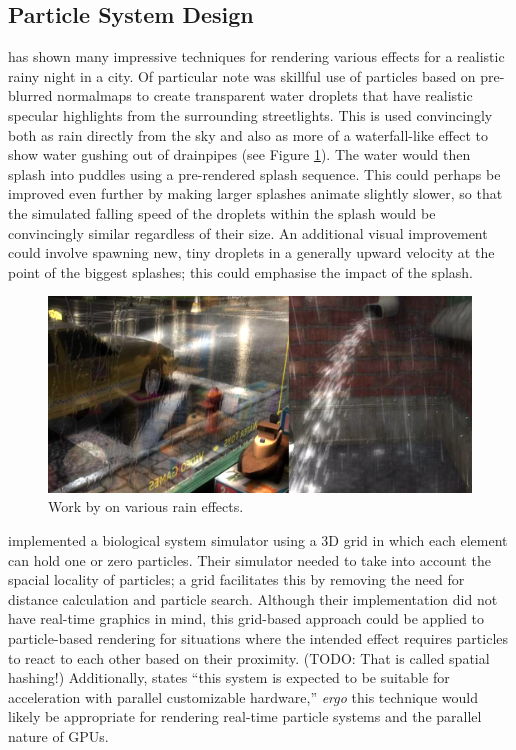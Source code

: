 \documentclass[11pt, a4paper, twocolumn]{article}
\begin{document}
\subsection{Particle System Design}

\citet{Tatarchuk2006} has shown many impressive techniques for rendering various effects for a realistic rainy night in a city. Of particular note was skillful use of particles based on pre-blurred normalmaps to create transparent water droplets that have realistic specular highlights from the surrounding streetlights. This is used convincingly both as rain directly from the sky and also as more of a waterfall-like effect to show water gushing out of drainpipes (see Figure \ref{fig:tatarchuk}). The water would then splash into puddles using a pre-rendered splash sequence. This could perhaps be improved even further by making larger splashes animate slightly slower, so that the simulated falling speed of the droplets within the splash would be convincingly similar regardless of their size. An additional visual improvement could involve spawning new, tiny droplets in a generally upward velocity at the point of the biggest splashes; this could emphasise the impact of the splash.

\begin{figure}[h]
\includegraphics[width=\linewidth]{tatarchuk}
\caption{Work by \citet{Tatarchuk2006} on various rain effects.}
\label{fig:tatarchuk}
\end{figure}

\citet{Boulianne2007} implemented a biological system simulator using a 3D grid in which each element can hold one or zero particles. Their simulator needed to take into account the spacial locality of particles; a grid facilitates this by removing the need for distance calculation and particle search. Although their implementation did not have real-time graphics in mind, this grid-based approach could be applied to particle-based rendering for situations where the intended effect requires particles to react to each other based on their proximity. (TODO: That is called spatial hashing!) Additionally, \citet{Boulianne2007} states ``this system is expected to be suitable for acceleration with parallel customizable hardware,'' \emph{ergo} this technique would likely be appropriate for rendering real-time particle systems and the parallel nature of GPUs.
\end{document}
